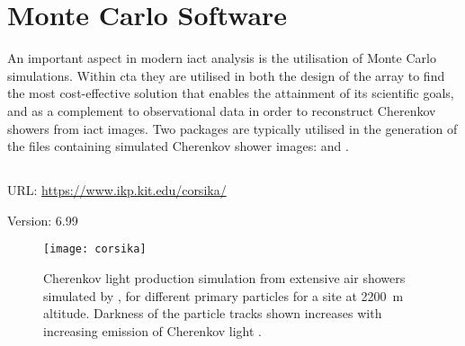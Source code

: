 \section{Monte Carlo Software}

An important aspect in modern \gls{iact} analysis is the utilisation of Monte Carlo simulations. Within \gls{cta} they are utilised in both the design of the array to find the most cost-effective solution that enables the attainment of its scientific goals, and as a complement to observational data in order to reconstruct Cherenkov showers from \gls{iact} images. Two packages are typically utilised in the generation of the files containing simulated Cherenkov shower images:  and .

\subsection{}
\vspace{-0.7em}
\noindent \hspace{\parindent} {\tiny URL: \url{https://www.ikp.kit.edu/corsika/} \par}
\noindent \hspace{\parindent} {\tiny Version: 6.99 \par}

\begin{figure}
  \texttt{[image: corsika]}
  \caption[ extensive air shower simulations.]{Cherenkov light production simulation from extensive air showers simulated by , for different primary particles for a site at \SI{2200}{m} altitude. Darkness of the particle tracks shown increases with increasing emission of Cherenkov light \cite{Bernlohr2008}.}
  \label{fig:corsika}
\end{figure}

